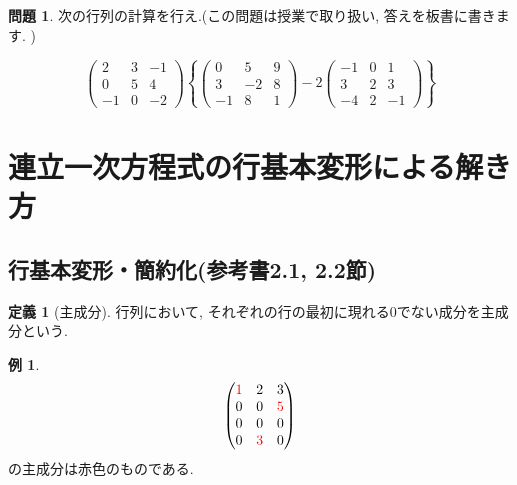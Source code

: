 \documentclass[dvipdfmx,a4paper,11pt]{article}
\theoremstyle{definition}
\newtheorem{dfn}[thm]{定義}
\newtheorem{exa}[thm]{例}
\newtheorem{ques}[thm]{問題}
\newcommand{\xr}[1]{\textcolor{red}{#1}}
\begin{document}
 \begin{ques}
 次の行列の計算を行え.(この問題は授業で取り扱い, 答えを板書に書きます. )

 $$
 \begin{pmatrix}
 2 &3&-1 \\
 0&5&4\\
 -1&0&-2
 \end{pmatrix}
 \left\{
 \begin{pmatrix}
 0 &5&9 \\
 3&-2&8\\
 -1&8&1
 \end{pmatrix}
 - 2
  \begin{pmatrix}
 -1 &0&1 \\
 3&2&3\\
 -4&2&-1
 \end{pmatrix}
\right\}
 $$
  \end{ques}
 
\newpage


\section{連立一次方程式の行基本変形による解き方}
\label{sec-6}

\subsection{行基本変形・簡約化(参考書2.1, 2.2節)}

\begin{tcolorbox}[
    colback = white,
    colframe = green!35!black,
    fonttitle = \bfseries,
    breakable = true]
    \begin{dfn}[主成分]
  行列において, それぞれの行の最初に現れる0でない成分を主成分という.
  \end{dfn}
 \end{tcolorbox}
 
 \begin{exa}
 $$
  \begin{pmatrix}
\xr{1} & 2&3\\
0 & 0&\xr{5}\\
0 & 0&0\\
0 & \xr{3}&0\\ 
 \end{pmatrix}
 $$
 の主成分は赤色のものである. 
 \end{exa}
\end{document}
